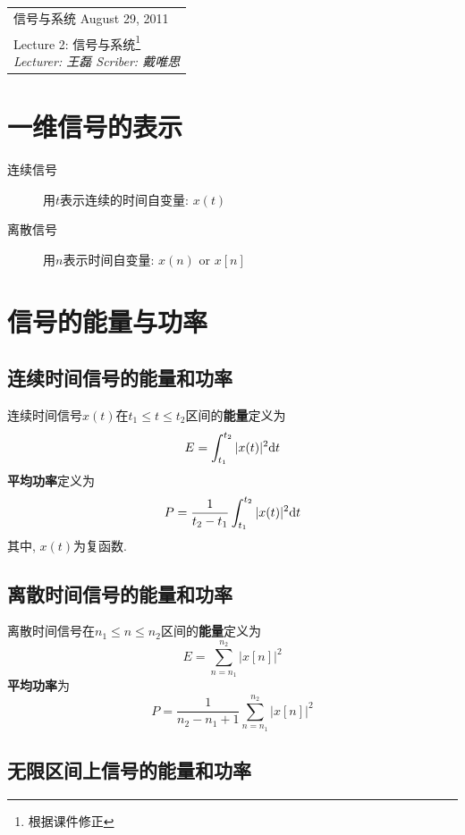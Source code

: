 \def\lecture{2}
\clearpage \noindent\begin{tabularx}{\linewidth}{|X|}
\hline \vskip -2mm
{\sf 信号与系统} \hfill August 29, 2011 \\
{\centering \sf \large Lecture \lecture:
信号与系统\footnote{根据课件修正} \\ }
\textit{Lecturer: 王磊 \hfill Scriber: 戴唯思}\\ \hline
\end{tabularx}
\setcounter{section}{0}
\renewcommand{\thepage}{\lecture -\arabic{page}}


\section{一维信号的表示}

    \begin{description}
        \item[连续信号] 用$t$表示连续的时间自变量: $x(t)$
        \item[离散信号] 用$n$表示时间自变量: $x(n)$ or $x[n]$
    \end{description}

\section{信号的能量与功率}

    \subsection{连续时间信号的能量和功率}

    连续时间信号$x(t)$在$t_1\leq t\leq t_2$区间的\textbf{能量}定义为
    \[ E=\int_{t_1}^{t_2}|{x(t)}|^2\mathrm{d} t \]
    \textbf{平均功率}定义为
    \[ P=\frac{1}{t_2-t_1}\int_{t_1}^{t_2}|x(t)|^2\mathrm{d} t \]
    其中, $x(t)$为复函数.

    \subsection{离散时间信号的能量和功率}

    离散时间信号在$n_1\leq n\leq n_2$区间的\textbf{能量}定义为
    \[ E=\sum_{n=n_1}^{n_2}|x[n]|^2 \]
    \textbf{平均功率}为
    \[ P=\frac{1}{n_2-n_1+1}\sum_{n=n_1}^{n_2}|x[n]|^2 \]

    \subsection{无限区间上信号的能量和功率}

